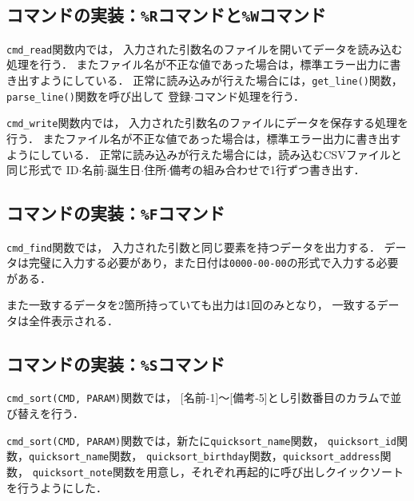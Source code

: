 \documentclass[autodetect-engine,dvi=dvipdfmx,ja=standard,
               a4j,11pt]{bxjsarticle}
\begin{document}
\subsection{コマンドの実装：\texttt{\%R}コマンドと\texttt{\%W}コマンド}

\verb|cmd_read|関数内では，
入力された引数名のファイルを開いてデータを読み込む処理を行う．
またファイル名が不正な値であった場合は，標準エラー出力に書き出すようにしている．
正常に読み込みが行えた場合には，\verb|get_line()|関数，\verb|parse_line()|関数を呼び出して
登録$\cdot$コマンド処理を行う．

\verb|cmd_write|関数内では，
入力された引数名のファイルにデータを保存する処理を行う．
またファイル名が不正な値であった場合は，標準エラー出力に書き出すようにしている．
正常に読み込みが行えた場合には，読み込むCSVファイルと同じ形式で
ID$\cdot$名前$\cdot$誕生日$\cdot$住所$\cdot$備考の組み合わせで1行ずつ書き出す．

\subsection{コマンドの実装：\texttt{\%F}コマンド}

\verb|cmd_find|関数では，
入力された引数と同じ要素を持つデータを出力する．
データは完璧に入力する必要があり，また日付は\verb|0000-00-00|の形式で入力する必要がある．

また一致するデータを2箇所持っていても出力は1回のみとなり，
一致するデータは全件表示される．

\subsection{コマンドの実装：\texttt{\%S}コマンド}

\verb|cmd_sort(CMD, PARAM)|関数では，
[名前-1]〜[備考-5]とし引数番目のカラムで並び替えを行う．

\verb|cmd_sort(CMD, PARAM)|関数では，新たに\verb|quicksort_name|関数，
\verb|quicksort_id|関数，\verb|quicksort_name|関数，
\verb|quicksort_birthday|関数，\verb|quicksort_address|関数，
\verb|quicksort_note|関数を用意し，それぞれ再起的に呼び出しクイックソートを行うようにした．
\end{document}
